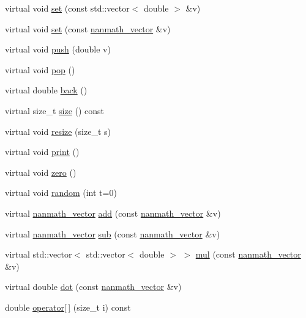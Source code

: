 \begin{DoxyCompactItemize}
virtual void \hyperlink{classnanmath_1_1nanmath__vector_afe89666a38d7fa8182c517ae91639253}{set} (const std\+::vector$<$ double $>$ \&v)
\item 
virtual void \hyperlink{classnanmath_1_1nanmath__vector_a3817b1a44c8c29befa7c72918f227e5f}{set} (const \hyperlink{classnanmath_1_1nanmath__vector}{nanmath\+\_\+vector} \&v)
\item 
virtual void \hyperlink{classnanmath_1_1nanmath__vector_af8019f9e3eb27a88c77cd302bd4e0f49}{push} (double v)
\item 
virtual void \hyperlink{classnanmath_1_1nanmath__vector_ad93f89bf79b97ada43b1b5eb6a20f3b8}{pop} ()
\item 
virtual double \hyperlink{classnanmath_1_1nanmath__vector_aee746173d201103146b602dbb48582c4}{back} ()
\item 
virtual size\+\_\+t \hyperlink{classnanmath_1_1nanmath__vector_a3cf8be42dcdac880c4107bd19ba2d034}{size} () const 
\item 
virtual void \hyperlink{classnanmath_1_1nanmath__vector_ab83eb8611ce5cc0056f3d66455a2c268}{resize} (size\+\_\+t s)
\item 
virtual void \hyperlink{classnanmath_1_1nanmath__vector_a2040460e12d62f93075a0ac5dcb47b67}{print} ()
\item 
virtual void \hyperlink{classnanmath_1_1nanmath__vector_a61b03b8b22481dc0fb233aca6062498a}{zero} ()
\item 
virtual void \hyperlink{classnanmath_1_1nanmath__vector_a4a174f6e1c4b2e9b5ab605c2cbbfca85}{random} (int t=0)
\item 
virtual \hyperlink{classnanmath_1_1nanmath__vector}{nanmath\+\_\+vector} \hyperlink{classnanmath_1_1nanmath__vector_a1fe657deb1a6f3b098cd3c1b386f592e}{add} (const \hyperlink{classnanmath_1_1nanmath__vector}{nanmath\+\_\+vector} \&v)
\item 
virtual \hyperlink{classnanmath_1_1nanmath__vector}{nanmath\+\_\+vector} \hyperlink{classnanmath_1_1nanmath__vector_a2d41772f5b4341d49b33e05aa37133bc}{sub} (const \hyperlink{classnanmath_1_1nanmath__vector}{nanmath\+\_\+vector} \&v)
\item 
virtual std\+::vector$<$ std\+::vector$<$ double $>$ $>$ \hyperlink{classnanmath_1_1nanmath__vector_ad39a2000dbf1c548f38d142295083020}{mul} (const \hyperlink{classnanmath_1_1nanmath__vector}{nanmath\+\_\+vector} \&v)
\item 
virtual double \hyperlink{classnanmath_1_1nanmath__vector_a146b0021c851cd9bf84ddc66dad014e7}{dot} (const \hyperlink{classnanmath_1_1nanmath__vector}{nanmath\+\_\+vector} \&v)
\item 
double \hyperlink{classnanmath_1_1nanmath__vector_aa1a70b8264872ac95c4ce36005ffe23b}{operator\mbox{[}$\,$\mbox{]}} (size\+\_\+t i) const 
\end{DoxyCompactItemize}
